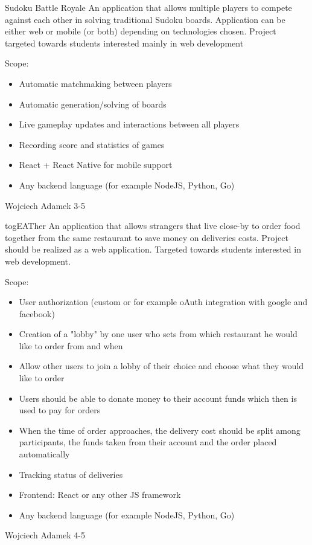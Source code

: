 \begin{project}
{Sudoku Battle Royale}
{An application that allows multiple players to compete against each other in solving traditional Sudoku boards. Application can be either web or mobile (or both) depending on technologies chosen. Project targeted towards students interested mainly in web development} 
{
Scope:
\begin{itemize}
	\item Automatic matchmaking between players
	\item Automatic generation/solving of boards
	\item Live gameplay updates and interactions between all players
	\item Recording score and statistics of games
\end{itemize}
}
{
\begin{itemize}
	\item React + React Native for mobile support
	\item Any backend language (for example NodeJS, Python, Go)
\end{itemize}
}
{Wojciech Adamek}
{3-5}
\end{project}
\begin{project}
{togEATher}
{An application that allows strangers that live close-by to order food together from the same restaurant to save money on deliveries costs. Project should be realized as a web application. Targeted towards students interested in web development.} 
{
Scope:
\begin{itemize}
	\item User authorization (custom or for example oAuth integration with google and facebook)
	\item Creation of a "lobby" by one user who sets from which restaurant he would like to order from and when
	\item Allow other users to join a lobby of their choice and choose what they would like to order
	\item Users should be able to donate money to their account funds which then is used to pay for orders
	\item When the time of order approaches, the delivery cost should be split among participants, the funds taken from their account and the order placed automatically
	\item Tracking status of deliveries
\end{itemize}
}
{
\begin{itemize}
	\item Frontend: React or any other JS framework
	\item Any backend language (for example NodeJS, Python, Go)
\end{itemize}
}
{Wojciech Adamek}
{4-5}
\end{project}
